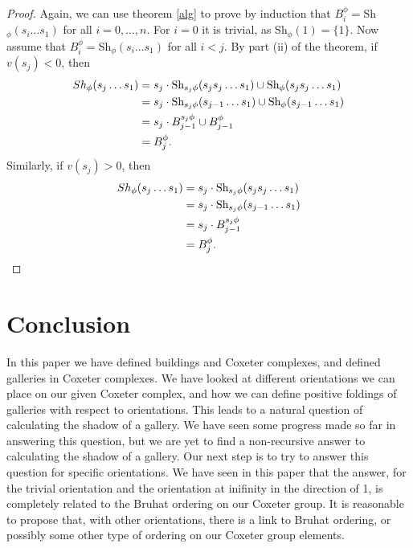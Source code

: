 \documentclass[11pt]{article}
\begin{document}
\begin{proof}
    Again, we can use theorem \ref{alg} to prove by induction that $B^\phi_i=$Sh$_\phi(s_i\hdots s_1)$ for all $i=0,\hdots ,n$. For $i=0$ it is trivial, as Sh$_\phi(1)=\{1\}$. Now assume that $B^\phi_i=$Sh$_\phi(s_i\hdots s_1)$ for all $i<j$. By part (ii) of the theorem, if $v(s_j)<0$, then
    \[\begin{aligned}
        Sh_\phi(s_j\hdots s_1)&=s_j\cdot \textnormal{Sh}_{s_j\phi}(s_js_j\hdots s_1)\cup \textnormal{Sh}_\phi(s_js_j\hdots s_1)\\
                        &=  s_j\cdot \textnormal{Sh}_{s_j\phi}(s_{j-1}\hdots s_1)\cup \textnormal{Sh}_\phi(s_{j-1}\hdots s_1)\\
                        &= s_j\cdot B^{s_j\phi}_{j-1}\cup B^{\phi}_{j-1}\\
                        &= B^\phi_j. 
    \end{aligned}\]
    Similarly, if $v(s_j)>0$, then
    \[\begin{aligned}
        Sh_\phi(s_j\hdots s_1)& = s_j\cdot \textnormal{Sh}_{s_j\phi}(s_js_j\hdots s_1)\\
                        & = s_j\cdot \textnormal{Sh}_{s_j\phi}(s_{j-1}\hdots s_1)\\
                        & = s_j \cdot B^{s_j\phi}_{j-1}\\
                        & = B^{\phi}_{j}. 
    \end{aligned}\]
\end{proof}


\section{Conclusion}

In this paper we have defined buildings and Coxeter complexes, and defined galleries in Coxeter complexes. We have looked at different orientations we can place on our given Coxeter complex, and how we can define positive foldings of galleries with respect to orientations. This leads to a natural question of calculating the shadow of a gallery. We have seen some progress made so far in answering this question, but we are yet to find a non-recursive answer to calculating the shadow of a gallery. Our next step is to try to answer this question for specific orientations. We have seen in this paper that the answer, for the trivial orientation and the orientation at inifinity in the direction of 1, is completely related to the Bruhat ordering on our Coxeter group. It is reasonable to propose that, with other orientations, there is a link to Bruhat ordering, or possibly some other type of ordering on our Coxeter group elements. 

\newpage


\end{document}
